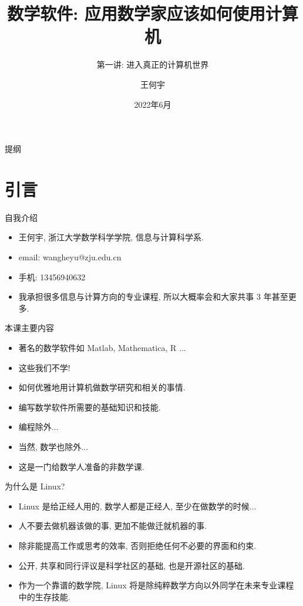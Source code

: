 \documentclass{beamer}
\title[Beamer + xelatex] %
{\Huge 数学软件: 应用数学家应该如何使用计算机}
\subtitle
{第一讲: 进入真正的计算机世界} %
\author[Wang HY] %
{王何宇}
\institute[ZJU] %
{
  浙江大学数学科学学院\\
  信息与计算科学系
}
\date[] %
{2022年6月}
\begin{document}
\begin{frame}
 \titlepage
\end{frame}
\begin{frame}{提纲}
  \tableofcontents
\end{frame}

\section{引言}

\begin{frame}{自我介绍}
  \begin{itemize}
  \item 王何宇, 浙江大学数学科学学院, 信息与计算科学系.
  \item email: wangheyu@zju.edu.cn
  \item 手机: 13456940632
  \item 我承担很多信息与计算方向的专业课程, 所以大概率会和大家共事 3 年甚至更多.
  \end{itemize}
\end{frame}

\begin{frame}{本课主要内容}
  \begin{itemize}
  \item<1-> 著名的数学软件如 Matlab, Mathematica, R ...
  \item<2-> 这些我们不学!
  \item<3-> 如何优雅地用计算机做数学研究和相关的事情.
  \item<4-> 编写数学软件所需要的基础知识和技能.
  \item<5-> 编程除外...
  \item<6-> 当然, 数学也除外...
  \item<7-> 这是一门给数学人准备的非数学课.
  \end{itemize}
\end{frame}

\begin{frame}{为什么是 Linux?}
  \begin{itemize}
  \item<1-> Linux 是给正经人用的, 数学人都是正经人, 至少在做数学的时候... 
  \item<2-> 人不要去做机器该做的事, 更加不能做迁就机器的事.
  \item<3-> 除非能提高工作或思考的效率, 否则拒绝任何不必要的界面和约束. 
  \item<4-> 公开, 共享和同行评议是科学社区的基础, 也是开源社区的基础.
  \item<5-> 作为一个靠谱的数学院, Linux 将是除纯粹数学方向以外同学在未来专业课程中的生存技能.
  \end{itemize}
\end{frame}
\end{document}
